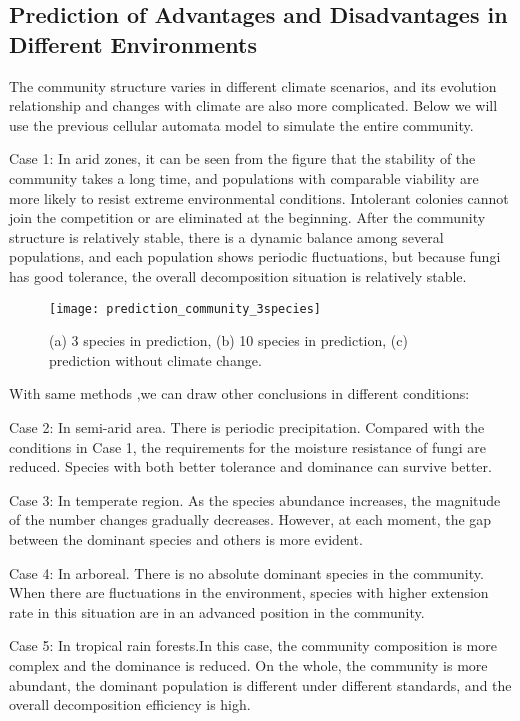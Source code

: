 \documentclass{mcmthesis}
\begin{document}
\subsection{Prediction of Advantages and Disadvantages in Different Environments }

The community structure varies in different climate scenarios, and its evolution relationship and changes with climate are also more complicated. Below we will use the previous cellular automata model to simulate the entire community. 

Case 1: In arid zones, it can be seen from the figure that the stability of the community takes a long time, and populations with comparable viability are more likely to resist extreme environmental conditions. Intolerant colonies cannot join the competition or are eliminated at the beginning. After the community structure is relatively stable, there is a dynamic balance among several populations, and each population shows periodic fluctuations, but because fungi has good tolerance, the overall decomposition situation is relatively stable. 

\begin{figure}[H]
  \small
  \centering
  \texttt{[image: prediction\_community\_3species]}
  \caption{(a) 3 species in prediction, (b) 10 species in prediction, (c) prediction without climate change.}
  \label{prediction_community_3species}
\end{figure}

With same methods ,we can draw other conclusions in different conditions:

Case 2: In semi-arid area. There is periodic precipitation. Compared with the conditions in Case 1, the requirements for the moisture resistance of fungi are reduced. Species with both better tolerance and dominance can survive better.

Case 3: In temperate region. As the species abundance increases, the magnitude of the number changes gradually decreases. However, at each moment, the gap between the dominant species and others is more evident. 

Case 4: In arboreal. There is no absolute dominant species in the community. When there are fluctuations in the environment, species with higher extension rate in this situation are in an advanced position in the community.

Case 5: In tropical rain forests.In this case, the community composition is more complex and the dominance is reduced. On the whole, the community is more abundant, the dominant population is different under different standards, and the overall decomposition efficiency is high.
\end{document}
